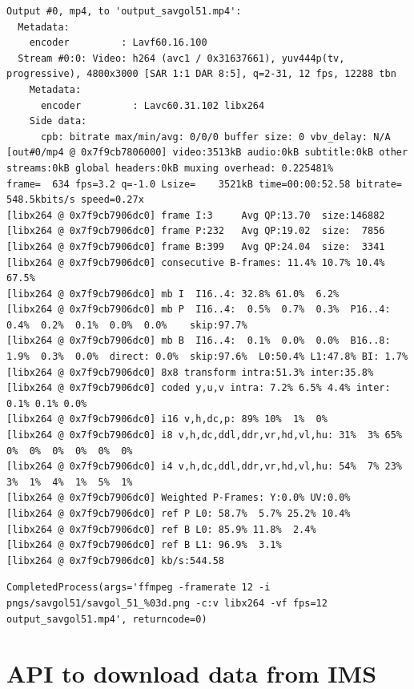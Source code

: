 \documentclass[
  letterpaper,
  DIV=11,
  numbers=noendperiod,
  oneside]{scrreprt}
\begin{document}
\begin{verbatim}
Output #0, mp4, to 'output_savgol51.mp4':
  Metadata:
    encoder         : Lavf60.16.100
  Stream #0:0: Video: h264 (avc1 / 0x31637661), yuv444p(tv, progressive), 4800x3000 [SAR 1:1 DAR 8:5], q=2-31, 12 fps, 12288 tbn
    Metadata:
      encoder         : Lavc60.31.102 libx264
    Side data:
      cpb: bitrate max/min/avg: 0/0/0 buffer size: 0 vbv_delay: N/A
[out#0/mp4 @ 0x7f9cb7806000] video:3513kB audio:0kB subtitle:0kB other streams:0kB global headers:0kB muxing overhead: 0.225481%
frame=  634 fps=3.2 q=-1.0 Lsize=    3521kB time=00:00:52.58 bitrate= 548.5kbits/s speed=0.27x    
[libx264 @ 0x7f9cb7906dc0] frame I:3     Avg QP:13.70  size:146882
[libx264 @ 0x7f9cb7906dc0] frame P:232   Avg QP:19.02  size:  7856
[libx264 @ 0x7f9cb7906dc0] frame B:399   Avg QP:24.04  size:  3341
[libx264 @ 0x7f9cb7906dc0] consecutive B-frames: 11.4% 10.7% 10.4% 67.5%
[libx264 @ 0x7f9cb7906dc0] mb I  I16..4: 32.8% 61.0%  6.2%
[libx264 @ 0x7f9cb7906dc0] mb P  I16..4:  0.5%  0.7%  0.3%  P16..4:  0.4%  0.2%  0.1%  0.0%  0.0%    skip:97.7%
[libx264 @ 0x7f9cb7906dc0] mb B  I16..4:  0.1%  0.0%  0.0%  B16..8:  1.9%  0.3%  0.0%  direct: 0.0%  skip:97.6%  L0:50.4% L1:47.8% BI: 1.7%
[libx264 @ 0x7f9cb7906dc0] 8x8 transform intra:51.3% inter:35.8%
[libx264 @ 0x7f9cb7906dc0] coded y,u,v intra: 7.2% 6.5% 4.4% inter: 0.1% 0.1% 0.0%
[libx264 @ 0x7f9cb7906dc0] i16 v,h,dc,p: 89% 10%  1%  0%
[libx264 @ 0x7f9cb7906dc0] i8 v,h,dc,ddl,ddr,vr,hd,vl,hu: 31%  3% 65%  0%  0%  0%  0%  0%  0%
[libx264 @ 0x7f9cb7906dc0] i4 v,h,dc,ddl,ddr,vr,hd,vl,hu: 54%  7% 23%  3%  1%  4%  1%  5%  1%
[libx264 @ 0x7f9cb7906dc0] Weighted P-Frames: Y:0.0% UV:0.0%
[libx264 @ 0x7f9cb7906dc0] ref P L0: 58.7%  5.7% 25.2% 10.4%
[libx264 @ 0x7f9cb7906dc0] ref B L0: 85.9% 11.8%  2.4%
[libx264 @ 0x7f9cb7906dc0] ref B L1: 96.9%  3.1%
[libx264 @ 0x7f9cb7906dc0] kb/s:544.58
\end{verbatim}

\begin{verbatim}
CompletedProcess(args='ffmpeg -framerate 12 -i pngs/savgol51/savgol_51_%03d.png -c:v libx264 -vf fps=12 output_savgol51.mp4', returncode=0)
\end{verbatim}

\hypertarget{api-to-download-data-from-ims}{%
\chapter*{API to download data from
IMS}\label{api-to-download-data-from-ims}}
\end{document}
